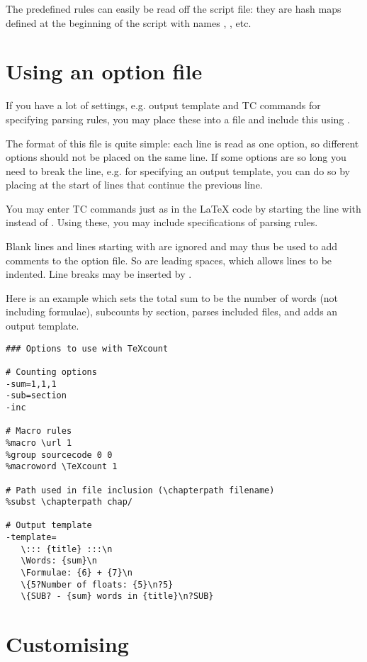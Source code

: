 \documentclass{article}
\begin{document}
The predefined rules can easily be read off the script file: they are hash maps defined at the beginning of the script with names , , etc.


\section{Using an option file}

If you have a lot of settings, e.g. output template and TC commands for specifying parsing rules, you may place these into a file and include this using .

The format of this file is quite simple: each line is read as one option, so different options should not be placed on the same line. If some options are so long you need to break the line, e.g. for specifying an output template, you can do so by placing \code{\bs{}} at the start of lines that continue the previous line.

You may enter TC commands just as in the \LaTeX{} code by starting the line with \code{\%} instead of . Using these, you may include specifications of parsing rules.

Blank lines and lines starting with \code{\#} are ignored and may thus be used to add comments to the option file. So are leading spaces, which allows lines to be indented. Line breaks may be inserted by .

Here is an example which sets the total sum to be the number of words (not including formulae), subcounts by section, parses included files, and adds an output template.

\begin{lstlisting}[frame=single]
### Options to use with TeXcount

# Counting options
-sum=1,1,1
-sub=section
-inc

# Macro rules
%macro \url 1
%group sourcecode 0 0
%macroword \TeXcount 1

# Path used in file inclusion (\chapterpath filename)
%subst \chapterpath chap/

# Output template
-template=
   \::: {title} :::\n
   \Words: {sum}\n
   \Formulae: {6} + {7}\n
   \{5?Number of floats: {5}\n?5}
   \{SUB? - {sum} words in {title}\n?SUB}
\end{lstlisting}



\section{Customising \TeXcount{}}
\end{document}
